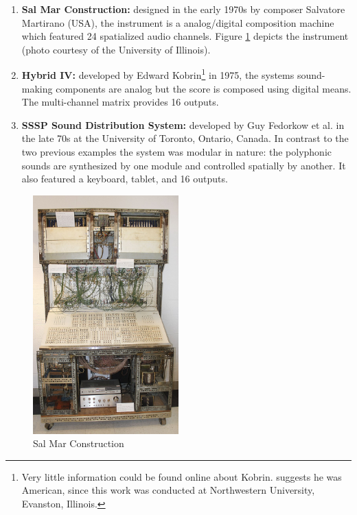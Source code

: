 \begin{enumerate}
    \item \textbf{Sal Mar Construction:} designed in the early 1970s by composer Salvatore Martirano (USA), the instrument is a analog/digital composition machine which featured 24 spatialized audio channels. Figure \ref{fig:sal-mar} depicts the instrument (photo courtesy of the University of Illinois).
    
    \item \textbf{Hybrid IV:} developed by Edward Kobrin\footnote{Very little information could be found online about Kobrin. \cite{kobrin1968solution} suggests he was American, since this work was conducted at Northwestern University, Evanston, Illinois.} in 1975, the systems sound-making components are analog but the score is composed using digital means. The multi-channel matrix provides 16 outputs. 
    
    \item \textbf{SSSP Sound Distribution System:} developed by Guy Fedorkow et al. in the late 70s at the University of Toronto, Ontario, Canada. In contrast to the two previous examples the system was modular in nature: the polyphonic sounds are synthesized by one module and controlled spatially by another. It also featured a keyboard, tablet, and 16 outputs. 
\end{enumerate}

\begin{figure}[ht!]%
\centering
\includegraphics[width=0.5\textwidth]{img/sal-mar.jpg} 
\caption{Sal Mar Construction \cite{FileTheS26online}}
\label{fig:sal-mar}
\end{figure}

